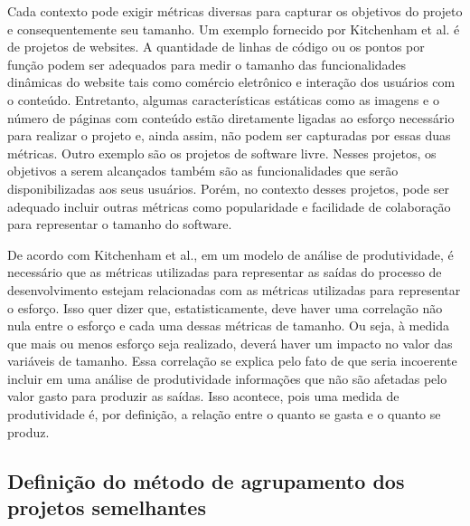 Cada contexto pode exigir métricas diversas para capturar os objetivos do projeto e consequentemente seu tamanho. Um exemplo fornecido por Kitchenham et al.\cite{kitchenham2004software} é de projetos de websites. A quantidade de linhas de código ou os pontos por função podem ser adequados para medir o tamanho das funcionalidades dinâmicas do website tais como comércio eletrônico e  interação dos usuários com o conteúdo. Entretanto, algumas características estáticas como as imagens e o número de páginas com conteúdo estão diretamente ligadas ao esforço necessário para realizar o projeto e, ainda assim, não podem ser capturadas por essas duas métricas. Outro exemplo são os projetos de software livre.  Nesses projetos, os objetivos a serem alcançados também são as funcionalidades que serão disponibilizadas aos seus usuários. Porém, no contexto desses projetos, pode ser adequado incluir outras métricas como popularidade e facilidade de colaboração para representar o tamanho do software. 

De acordo com Kitchenham et al.\cite{kitchenham2004software}, em um modelo de análise de produtividade, é necessário que as métricas utilizadas para representar as saídas do processo de desenvolvimento estejam relacionadas com as métricas utilizadas para representar o esforço. Isso quer dizer que, estatisticamente, deve haver uma correlação não nula entre o esforço e cada uma dessas métricas de tamanho. Ou seja, à medida que mais ou menos esforço seja realizado, deverá haver um impacto no valor das variáveis de tamanho. Essa correlação se explica pelo fato de que seria incoerente incluir em uma análise de produtividade informações que não são afetadas pelo valor gasto para produzir as saídas. Isso acontece, pois uma medida de produtividade é, por definição, a relação entre o quanto se gasta e o quanto se produz. 







\subsection{Definição do método de agrupamento dos projetos semelhantes }

